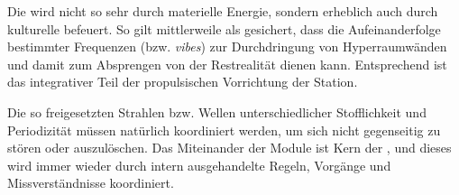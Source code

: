 \begin{newstuff}
    Die  wird nicht so sehr durch materielle Energie, sondern erheblich auch durch kulturelle befeuert. So gilt mittlerweile als gesichert, dass die Aufeinanderfolge bestimmter Frequenzen (bzw. \emph{vibes}) zur Durchdringung von Hyperraumwänden und damit zum Absprengen von der Restrealität dienen kann. Entsprechend ist das  integrativer Teil der propulsischen Vorrichtung der Station.

    Die so freigesetzten Strahlen bzw. Wellen unterschiedlicher Stofflichkeit und Periodizität müssen natürlich koordiniert werden, um sich nicht gegenseitig zu stören oder auszulöschen. Das Miteinander der Module ist Kern der , und dieses wird immer wieder durch intern ausgehandelte Regeln, Vorgänge und Missverständnisse koordiniert.
\end{newstuff}